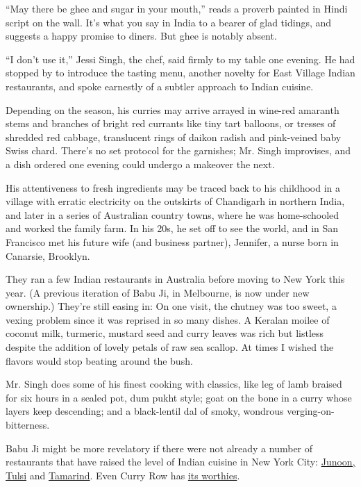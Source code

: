 ``May there be ghee and sugar in your mouth,'' reads a proverb painted
in Hindi script on the wall. It's what you say in India to a bearer of
glad tidings, and suggests a happy promise to diners. But ghee is
notably absent.

``I don't use it,'' Jessi Singh, the chef, said firmly to my table one
evening. He had stopped by to introduce the tasting menu, another
novelty for East Village Indian restaurants, and spoke earnestly of a
subtler approach to Indian cuisine.

Depending on the season, his curries may arrive arrayed in wine-red
amaranth stems and branches of bright red currants like tiny tart
balloons, or tresses of shredded red cabbage, translucent rings of
daikon radish and pink-veined baby Swiss chard. There's no set protocol
for the garnishes; Mr. Singh improvises, and a dish ordered one evening
could undergo a makeover the next.

His attentiveness to fresh ingredients may be traced back to his
childhood in a village with erratic electricity on the outskirts of
Chandigarh in northern India, and later in a series of Australian
country towns, where he was home-schooled and worked the family farm. In
his 20s, he set off to see the world, and in San Francisco met his
future wife (and business partner), Jennifer, a nurse born in Canarsie,
Brooklyn.

They ran a few Indian restaurants in Australia before moving to New York
this year. (A previous iteration of Babu Ji, in Melbourne, is now under
new ownership.) They're still easing in: On one visit, the chutney was
too sweet, a vexing problem since it was reprised in so many dishes. A
Keralan moilee of coconut milk, turmeric, mustard seed and curry leaves
was rich but listless despite the addition of lovely petals of raw sea
scallop. At times I wished the flavors would stop beating around the
bush.

Mr. Singh does some of his finest cooking with classics, like leg of
lamb braised for six hours in a sealed pot, dum pukht style; goat on the
bone in a curry whose layers keep descending; and a black-lentil dal of
smoky, wondrous verging-on-bitterness.

Babu Ji might be more revelatory if there were not already a number of
restaurants that have raised the level of Indian cuisine in New York
City:
\href{http://www.nytimes3xbfgragh.onion/2011/03/30/dining/reviews/30rest.html}{Junoon,
Tulsi} and
\href{http://www.nytimes3xbfgragh.onion/2001/02/16/arts/diner-s-journal.html}{Tamarind}.
Even Curry Row has
\href{http://www.nytimes3xbfgragh.onion/2013/04/24/dining/reviews/hungry-city-malai-marke-in-the-east-village.html?_r=0}{its
worthies}.

